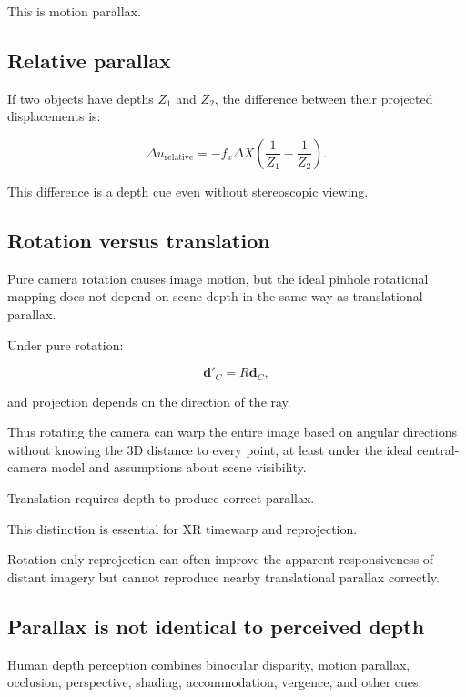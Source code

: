 This is motion parallax.

\subsection{Relative parallax}\label{02-foundations-ii-ch035-relative-parallax}

If two objects have depths \(Z_1\) and \(Z_2\), the difference between their projected displacements is:

\[ \boxed{ \Delta u_{\mathrm{relative}} = -f_x\Delta X \left( \frac1{Z_1}-\frac1{Z_2} \right). } \]

This difference is a depth cue even without stereoscopic viewing.

\subsection{Rotation versus translation}\label{02-foundations-ii-ch035-rotation-versus-translation}

Pure camera rotation causes image motion, but the ideal pinhole rotational mapping does not depend on scene depth in the same way as translational parallax.

Under pure rotation:

\[ \mathbf d'_C=R\mathbf d_C, \]

and projection depends on the direction of the ray.

Thus rotating the camera can warp the entire image based on angular directions without knowing the 3D distance to every point, at least under the ideal central-camera model and assumptions about scene visibility.

Translation requires depth to produce correct parallax.

This distinction is essential for XR timewarp and reprojection.

Rotation-only reprojection can often improve the apparent responsiveness of distant imagery but cannot reproduce nearby translational parallax correctly.

\subsection{Parallax is not identical to perceived depth}\label{02-foundations-ii-ch035-parallax-is-not-identical-to-perceived-depth}

Human depth perception combines binocular disparity, motion parallax, occlusion, perspective, shading, accommodation, vergence, and other cues.

